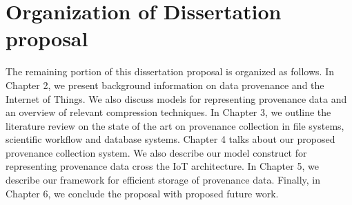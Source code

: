 \section{Organization of Dissertation proposal}

The remaining portion of this dissertation proposal is organized as follows. In Chapter 2, we present background information on data provenance and the Internet of Things. We also discuss models for representing provenance data and an overview of relevant compression techniques. In Chapter 3, we outline the literature review on the state of the art on provenance collection in file systems, scientific workflow and database systems. Chapter 4 talks about our proposed provenance collection system. We also describe our model construct for representing provenance data cross the IoT architecture. In Chapter 5, we describe our framework for efficient storage of provenance data. Finally, in Chapter 6, we conclude the proposal with proposed future work.

